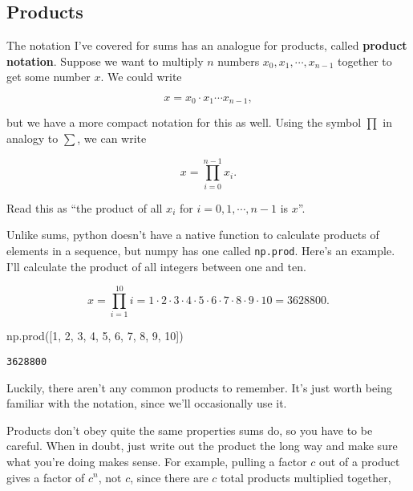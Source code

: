 \documentclass[
  letterpaper,
  DIV=11,
  numbers=noendperiod]{scrreprt}
\newenvironment{Shaded}{\begin{snugshade}}{\end{snugshade}}
\newcommand{\DecValTok}[1]{\textcolor[rgb]{0.68,0.00,0.00}{#1}}
\newcommand{\NormalTok}[1]{\textcolor[rgb]{0.00,0.23,0.31}{#1}}
\begin{document}
\hypertarget{products}{%
\subsection{Products}\label{products}}

The notation I've covered for sums has an analogue for products, called
\textbf{product notation}. Suppose we want to multiply \(n\) numbers
\(x_0,x_1,\cdots,x_{n-1}\) together to get some number \(x\). We could
write

\[x = x_0 \cdot x_1 \cdots x_{n-1},\]

but we have a more compact notation for this as well. Using the symbol
\(\prod\) in analogy to \(\sum\), we can write

\[x = \prod_{i=0}^{n-1} x_i.\]

Read this as ``the product of all \(x_i\) for \(i=0,1,\cdots,n-1\) is
\(x\)''.

Unlike sums, python doesn't have a native function to calculate products
of elements in a sequence, but numpy has one called \texttt{np.prod}.
Here's an example. I'll calculate the product of all integers between
one and ten.

\[x = \prod_{i=1}^{10} i = 1 \cdot 2 \cdot 3 \cdot 4 \cdot 5 \cdot 6 \cdot 7 \cdot 8 \cdot 9 \cdot 10 = 3628800.\]

\begin{Shaded}
\begin{Highlighting}[]
\NormalTok{np.prod([}\DecValTok{1}\NormalTok{, }\DecValTok{2}\NormalTok{, }\DecValTok{3}\NormalTok{, }\DecValTok{4}\NormalTok{, }\DecValTok{5}\NormalTok{, }\DecValTok{6}\NormalTok{, }\DecValTok{7}\NormalTok{, }\DecValTok{8}\NormalTok{, }\DecValTok{9}\NormalTok{, }\DecValTok{10}\NormalTok{])}
\end{Highlighting}
\end{Shaded}

\begin{verbatim}
3628800
\end{verbatim}

Luckily, there aren't any common products to remember. It's just worth
being familiar with the notation, since we'll occasionally use it.

Products don't obey quite the same properties sums do, so you have to be
careful. When in doubt, just write out the product the long way and make
sure what you're doing makes sense. For example, pulling a factor \(c\)
out of a product gives a factor of \(c^n\), not \(c\), since there are
\(c\) total products multiplied together,
\end{document}
